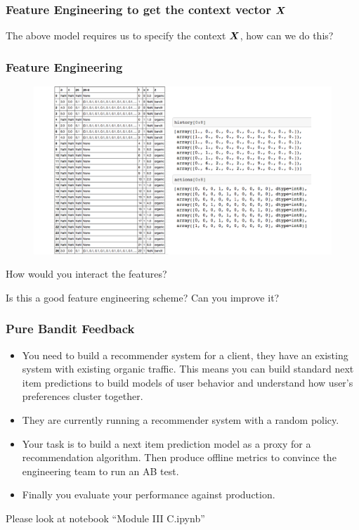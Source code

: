 \begin{frame}
  \frametitle{Feature Engineering to get the context vector $\bm{X}$}

  The above model requires us to specify the context $\bm{X}$, how can we do this?
\end{frame}



\begin{frame}
  \frametitle{Feature Engineering}
\begin{figure}[h!]
\includegraphics[scale=0.3]{images/feature_engineering.png}
\centering
\end{figure}

\pause
How would you interact the features?

\pause
Is this a good feature engineering scheme?  Can you improve it?
\end{frame}




\begin{frame}
  \frametitle{Pure Bandit Feedback}

    \begin{itemize}
      \item You need to build a recommender system for a client, they have an existing system with existing organic traffic.  \pause This means you can build standard next item predictions to build models of user behavior and understand how user's preferences cluster together. \pause
      \item They are currently running a recommender system with a random policy. \pause
      \item Your task is to build a next item prediction model as a proxy for a recommendation algorithm.  Then produce offline metrics to convince the engineering team to run an AB test.\pause
      \item Finally you evaluate your performance against production.
    \end{itemize}

    \pause
    Please look at notebook ``Module III C.ipynb''

\end{frame}




